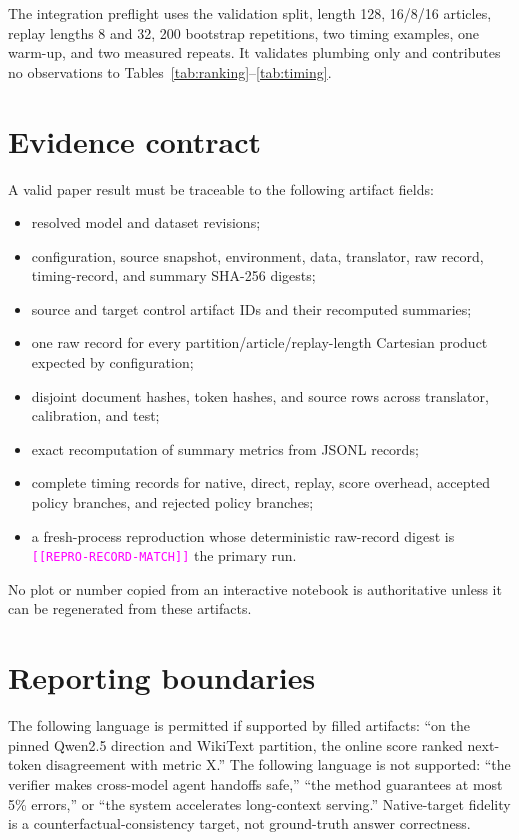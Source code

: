 \documentclass[10pt,twocolumn]{article}
\newcommand{\result}[1]{\textcolor{magenta}{\texttt{[[#1]]}}}
\begin{document}
The integration preflight uses the validation split, length 128, 16/8/16
articles, replay lengths 8 and 32, 200 bootstrap repetitions, two timing
examples, one warm-up, and two measured repeats.  It validates plumbing only
and contributes no observations to Tables~\ref{tab:ranking}--\ref{tab:timing}.

\section{Evidence contract}

A valid paper result must be traceable to the following artifact fields:

\begin{itemize}[leftmargin=*,itemsep=2pt]
  \item resolved model and dataset revisions;
  \item configuration, source snapshot, environment, data, translator, raw
  record, timing-record, and summary SHA-256 digests;
  \item source and target control artifact IDs and their recomputed summaries;
  \item one raw record for every partition/article/replay-length Cartesian
  product expected by configuration;
  \item disjoint document hashes, token hashes, and source rows across
  translator, calibration, and test;
  \item exact recomputation of summary metrics from JSONL records;
  \item complete timing records for native, direct, replay, score overhead,
  accepted policy branches, and rejected policy branches;
  \item a fresh-process reproduction whose deterministic raw-record digest is
  \result{REPRO-RECORD-MATCH} the primary run.
\end{itemize}

No plot or number copied from an interactive notebook is authoritative unless
it can be regenerated from these artifacts.

\section{Reporting boundaries}

The following language is permitted if supported by filled artifacts:
``on the pinned Qwen2.5 direction and WikiText partition, the online score
ranked next-token disagreement with metric X.''  The following language is not
supported: ``the verifier makes cross-model agent handoffs safe,'' ``the method
guarantees at most 5\% errors,'' or ``the system accelerates long-context
serving.''  Native-target fidelity is a counterfactual-consistency target, not
ground-truth answer correctness.
\end{document}
